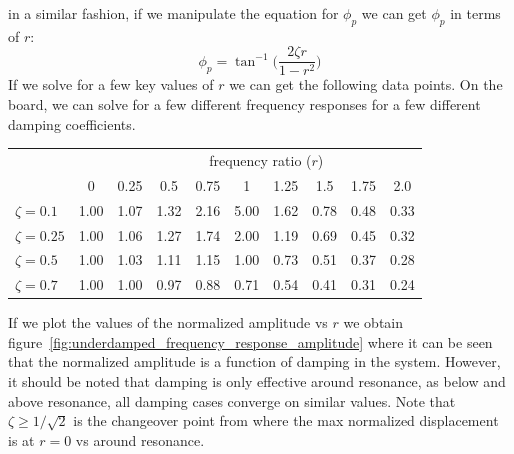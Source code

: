 \documentclass[12pt,letter]{article}
\begin{document}
	in a similar fashion, if we manipulate the equation for $\phi_p$ we can get $\phi_p$ in terms of $r$:
	\begin{equation}
		\phi_p = \tan^{-1} \bigg(\frac{2 \zeta r}{1-r^2}\bigg)
	\end{equation}	
	If we solve for a few key values of $r$ we can get the following data points. On the board, we can solve for a few different frequency responses for a few different damping coefficients. 
	\begin{table}[H]
		\centering
		\begin{tabular}{@{}lccccccccc@{}}
		\toprule
 & & \multicolumn{8}{c}{frequency ratio ($r$)} \\ 
 & 0 & 0.25& 0.5& 0.75& 1& 1.25& 1.5& 1.75& 2.0 \\ \midrule
		$\zeta=0.1$	&	1.00&	1.07&	1.32&	2.16&	5.00&	1.62&	0.78&	0.48 & 0.33 \\ 
		$\zeta=0.25$	&	1.00&	1.06&	1.27&	1.74&	2.00&	1.19&	0.69&	0.45 & 0.32 \\ 
		$\zeta=0.5$	&	1.00&	1.03&	1.11&	1.15&	1.00&	0.73&	0.51&	0.37 & 0.28\\ 
		$\zeta=0.7$	&	1.00&  1.00	&   0.97&	0.88&	0.71&	0.54&	0.41&	0.31 & 0.24\\\bottomrule
		\end{tabular}
	\end{table}
	If we plot the values of the normalized amplitude vs $r$ we obtain figure~\ref{fig:underdamped_frequency_response_amplitude} where it can be seen that the normalized amplitude is a function of damping in the system. However, it should be noted that damping is only effective around resonance, as below and above resonance, all damping cases converge on similar values. Note that $\zeta \ge 1/\sqrt{2}$ is the changeover point from where the max normalized displacement is at $r=0$ vs around resonance.  
\end{document}
